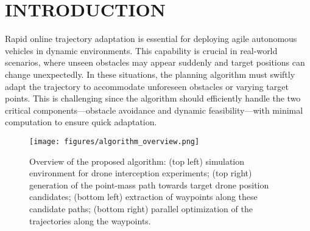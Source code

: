 \section{INTRODUCTION}


Rapid online trajectory adaptation is essential for deploying agile autonomous vehicles in dynamic environments. 
This capability is crucial in real-world scenarios, where unseen obstacles may appear suddenly and target positions can change unexpectedly. 
In these situations, the planning algorithm must swiftly adapt the trajectory to accommodate unforeseen obstacles or varying target points. 
This is challenging since the algorithm should efficiently handle the two critical components—obstacle avoidance and dynamic feasibility—with minimal computation to ensure quick adaptation.

\begin{figure}[tb]
    \centering
    \texttt{[image: figures/algorithm\_overview.png]}
    \vspace{-1\baselineskip}
    \caption{Overview of the proposed algorithm: 
    (top left) simulation environment for drone interception experiments;
    (top right) generation of the point-mass path towards target drone position candidates; 
    (bottom left) extraction of waypoints along these candidate paths; 
    (bottom right) parallel optimization of the trajectories along the waypoints.}
    \label{fig:alg_overview}
    \vspace{-0.5\baselineskip}
\end{figure}


